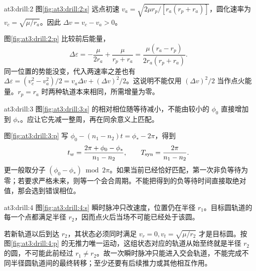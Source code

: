 \begin{drillsolution}{at3:drill:2}
图\ref{fig:at3:drill:2:s} 远点初速 $v_a=\sqrt{2\mu r_p/[r_a(r_p+r_a)]}$，圆化速率为 $v_c=\sqrt{\mu/r_a}$。因此 $\Delta v=v_c-v_a>0$。

图\ref{fig:at3:drill:2:p} 比较前后能量，
\[\Delta\varepsilon=-\frac\mu{2r_a}+\frac\mu{r_p+r_a}
=\frac{\mu(r_a-r_p)}{2r_a(r_p+r_a)}.\]
同一位置的势能没变，代入两速率之差也有 $\Delta\varepsilon=(v_c^2-v_a^2)/2=v_a\Delta v+(\Delta v)^2/2$。这说明不能仅用 $(\Delta v)^2/2$ 当作点火能量。$r_p=r_a$ 时两种轨道本来相同，所需增量为零。\end{drillsolution}
\begin{drillsolution}{at3:drill:3}
图\ref{fig:at3:drill:3:s} 的相对相位随等待减小，不能由较小的 $\phi_0$ 直接增加到 $\phi_*$。应让它先减一整周，再在同余意义上匹配。

图\ref{fig:at3:drill:3:p} 写 $\phi_0-(n_1-n_2)t=\phi_*-2\pi$，得到
\[t_w=\frac{2\pi+\phi_0-\phi_*}{n_1-n_2},\qquad T_{\rm syn}=\frac{2\pi}{n_1-n_2}.\]
更一般取分子 $(\phi_0-\phi_*)\bmod2\pi$。如果当前已经恰好匹配，第一次非负等待为零；若要求严格未来，则等一个会合周期。不能把得到的负等待时间直接取绝对值，那会选到错误相位。\end{drillsolution}
\begin{drillsolution}{at3:drill:4}
图\ref{fig:at3:drill:4:s} 瞬时脉冲只改速度，位置仍在半径 $r_1$。目标圆轨道的每一个点都满足半径 $r_2$，因而点火后当场不可能已经处于该圆。

若新轨道以后到达 $r_2$，其状态必须同时满足 $v_r=0,v_t=\sqrt{\mu/r_2}$ 才是目标圆。按 图\ref{fig:at3:drill:4:p} 的无推力唯一运动，这组状态对应的轨道从始至终就是半径 $r_2$ 的圆，不可能此前经过 $r_1\ne r_2$。故一次瞬时脉冲只能进入交会轨道，不能完成不同半径圆轨道间的最终转移；至少还要有后续推力或其他相互作用。\end{drillsolution}
